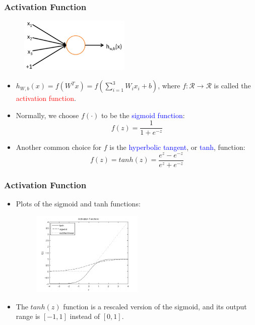 \documentclass{beamer}
\newcommand{\tr}[1]{\textcolor{red}{#1}} %
\newcommand{\tb}[1]{\textcolor{blue}{#1}} %
\newcommand{\beq}[1]{\vspace{-0.02in}\begin{equation}#1\end{equation}\vspace{-0.02in}}
\begin{document}
\begin{frame}
\frametitle{Activation Function}

\begin{figure}
      \includegraphics[height=2.6cm]{figs/SingleNeuron.png}
\end{figure}

\begin{itemize}
\item $h_{W,b}(x)=f(W^{T}x)=f(\sum_{i=1}^{3}W_ix_i+b)$, where $f: \mathcal{R} \rightarrow \mathcal{R}$ is called the \tr{activation function}.
\item Normally, we choose $f(\cdot)$ to be the \tb{sigmoid function}:
\beq{
f(z)=\frac{1}{1+e^{-z}}
}
\item Another common choice for $f$ is the \tb{hyperbolic tangent}, or \tb{tanh}, function:
\beq{
f(z)=tanh(z)=\frac{e^{z}-e^{-z}}{e^{z}+e^{-z}}
}
\end{itemize}

\end{frame}

\begin{frame}
\frametitle{Activation Function}
\begin{itemize}
\item Plots of the sigmoid and tanh functions:
\begin{figure}
      \includegraphics[height=4cm]{figs/Activation_functions.png}
\end{figure}

\item The $tanh(z)$ function is a rescaled version of the sigmoid, and its output range is $[-1,1]$ instead of $[0,1]$. 

\end{itemize}
\end{frame}
\end{document}
